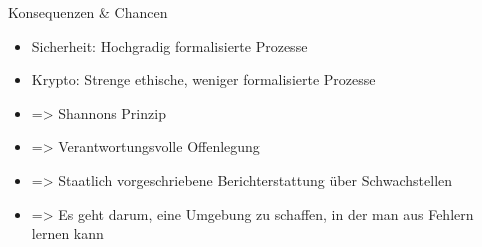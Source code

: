 \begin{frame}{Konsequenzen \& Chancen}
  \begin{itemize}
    \item  Sicherheit: Hochgradig formalisierte Prozesse
    \item  Krypto: Strenge ethische, weniger formalisierte Prozesse 
    \item  => Shannons Prinzip
    \item  => Verantwortungsvolle Offenlegung
    \item  => Staatlich vorgeschriebene Berichterstattung über Schwachstellen
    \item  => Es geht darum, eine Umgebung zu schaffen, in der man aus Fehlern lernen kann
  \end{itemize}
\end{frame}
